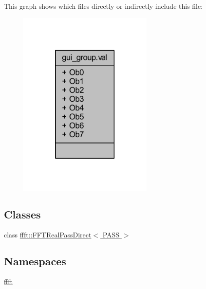 This graph shows which files directly or indirectly include this file\+:
\nopagebreak
\begin{figure}[H]
\begin{center}
\leavevmode
\includegraphics[width=190pt]{d3/dcc/a00264}
\end{center}
\end{figure}
\subsection*{Classes}
\begin{DoxyCompactItemize}
\item 
class \hyperlink{a00013}{ffft\+::\+F\+F\+T\+Real\+Pass\+Direct$<$ P\+A\+S\+S $>$}
\end{DoxyCompactItemize}
\subsection*{Namespaces}
\begin{DoxyCompactItemize}
\item 
 \hyperlink{a00142}{ffft}
\end{DoxyCompactItemize}
